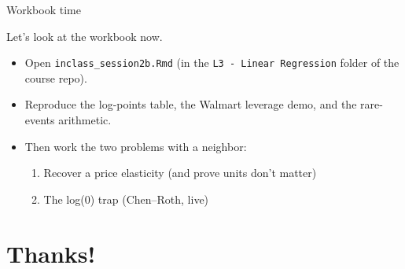 \documentclass[aspectratio=169,11pt]{beamer}
\begin{document}
\begin{frame}{Workbook time}
\begin{center}
{\LARGE \alert{Let's look at the workbook now.}}
\end{center}
\bigskip
\begin{itemize}
	\item Open \texttt{inclass\_session2b.Rmd} (in the \texttt{L3 - Linear Regression} folder of the course repo).
	\item Reproduce the log-points table, the Walmart leverage demo, and the rare-events arithmetic.
	\item Then work the two problems with a neighbor:
	\begin{enumerate}
		\item Recover a price elasticity (and prove units don't matter)
		\item The log(0) trap (Chen--Roth, live)
	\end{enumerate}
\end{itemize}
\end{frame}


\section{Thanks!}
\end{document}
